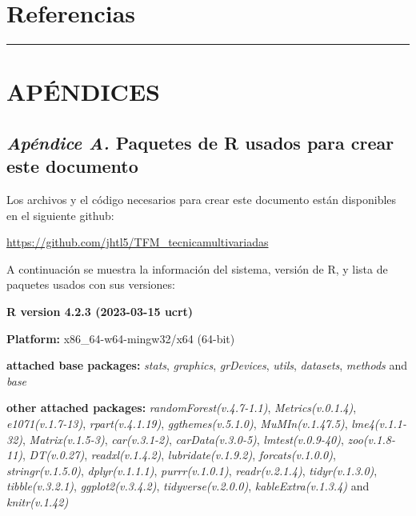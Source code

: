 \documentclass[
  11pt,
  bookmarksnumbered]{article}
\begin{document}
\newpage

\hypertarget{referencias}{%
\section*{Referencias}\label{referencias}}

\AtNextBibliography{\normalsize}
\printbibliography[heading=none]
\normalsize

\def\printbibliography{}

\begin{center}\rule{0.5\linewidth}{0.5pt}\end{center}

\hypertarget{apuxe9ndices}{%
\section*{APÉNDICES}\label{apuxe9ndices}}

\hypertarget{appendix-apuxe9ndice}{%
\appendix}


\hypertarget{paquetes-list}{%
\subsection*{\texorpdfstring{\emph{Apéndice A.} Paquetes de R usados para crear este documento}{Apéndice A. Paquetes de R usados para crear este documento}}\label{paquetes-list}}

Los archivos y el código necesarios para crear este documento están disponibles en el siguiente github:

\url{https://github.com/jhtl5/TFM_tecnicamultivariadas}

A continuación se muestra la información del sistema, versión de R, y lista de paquetes usados con sus versiones:

\textbf{R version 4.2.3 (2023-03-15 ucrt)}

\textbf{Platform:} x86\_64-w64-mingw32/x64 (64-bit)

\textbf{attached base packages:}
\emph{stats}, \emph{graphics}, \emph{grDevices}, \emph{utils}, \emph{datasets}, \emph{methods} and \emph{base}

\textbf{other attached packages:}
\emph{randomForest(v.4.7-1.1)}, \emph{Metrics(v.0.1.4)}, \emph{e1071(v.1.7-13)}, \emph{rpart(v.4.1.19)}, \emph{ggthemes(v.5.1.0)}, \emph{MuMIn(v.1.47.5)}, \emph{lme4(v.1.1-32)}, \emph{Matrix(v.1.5-3)}, \emph{car(v.3.1-2)}, \emph{carData(v.3.0-5)}, \emph{lmtest(v.0.9-40)}, \emph{zoo(v.1.8-11)}, \emph{DT(v.0.27)}, \emph{readxl(v.1.4.2)}, \emph{lubridate(v.1.9.2)}, \emph{forcats(v.1.0.0)}, \emph{stringr(v.1.5.0)}, \emph{dplyr(v.1.1.1)}, \emph{purrr(v.1.0.1)}, \emph{readr(v.2.1.4)}, \emph{tidyr(v.1.3.0)}, \emph{tibble(v.3.2.1)}, \emph{ggplot2(v.3.4.2)}, \emph{tidyverse(v.2.0.0)}, \emph{kableExtra(v.1.3.4)} and \emph{knitr(v.1.42)}
\end{document}
